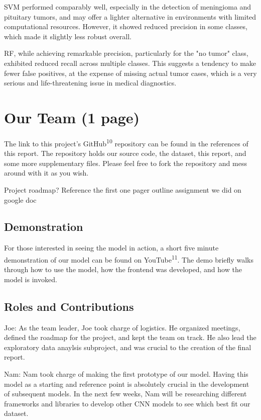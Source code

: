\documentclass[conference]{IEEEtran}
\begin{document}
SVM performed comparably well, especially in the detection of meningioma and pituitary tumors, and may offer a lighter alternative in environments with limited computational resources. However, it showed reduced precision in some classes, which made it slightly less robust overall.

RF, while achieving remarkable precision, particularly for the "no tumor" class, exhibited reduced recall across multiple classes. This suggests a tendency to make fewer false positives, at the expense of missing actual tumor cases, which is a very serious and life-threatening issue in medical diagnostics.

\section{\large Our Team (1 page)}

The link to this project's GitHub\textsuperscript{10} repository can be found in the references of this report. The repository holds our source code, the dataset, this report, and some more supplementary files. Please feel free to fork the repository and mess around with it as you wish.

Project roadmap? Reference the first one pager outline assignment we did on google doc

\subsection{\large Demonstration}

For those interested in seeing the model in action, a short five minute demonstration of our model can be found on YouTube\textsuperscript{11}. The demo briefly walks through how to use the model, how the frontend was developed, and how the model is invoked.

\subsection{\large Roles and Contributions}

Joe: As the team leader, Joe took charge of logistics. He organized meetings, defined the roadmap for the project, and kept the team on track. He also lead the exploratory data anaylsis subproject, and was crucial to the creation of the final report. 

Nam: Nam took charge of making the first prototype of our model. Having this model as a starting and reference point is absolutely crucial in the development of subsequent models. In the next few weeks, Nam will be researching different frameworks and libraries to develop other CNN models to see which best fit our dataset.
\end{document}
